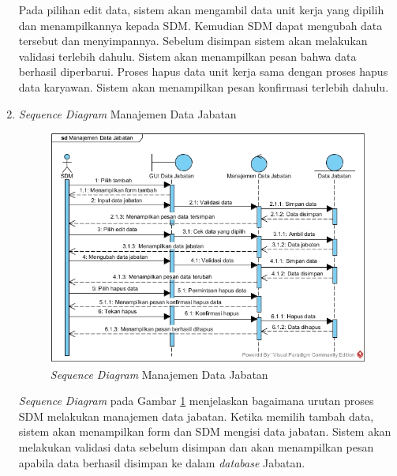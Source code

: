 \begin{enumerate}
            		Pada pilihan edit data, sistem akan mengambil data unit kerja yang dipilih dan menampilkannya kepada SDM. Kemudian SDM dapat mengubah data tersebut dan menyimpannya. Sebelum disimpan sistem akan melakukan validasi terlebih dahulu. Sistem akan menampilkan pesan bahwa data berhasil diperbarui. Proses hapus data unit kerja sama dengan proses hapus data karyawan. Sistem akan menampilkan pesan konfirmasi terlebih dahulu.
            	\item \emph{Sequence Diagram} Manajemen Data Jabatan
			        \begin{figure}[H]
            		    \centering
            		    \includegraphics[width=13cm]{gambar/sequence/manajemen-jabatan}
            		    \caption{\emph{Sequence Diagram} Manajemen Data Jabatan}
            		    \label{sequence_manajemen_jabatan}
            		\end{figure}
            		\emph{Sequence Diagram} pada Gambar \ref{sequence_manajemen_jabatan} menjelaskan bagaimana urutan proses SDM melakukan manajemen data jabatan. Ketika memilih tambah data, sistem akan menampilkan form dan SDM mengisi data jabatan. Sistem akan melakukan validasi data sebelum disimpan dan akan menampilkan pesan apabila data berhasil disimpan ke dalam \emph{database} Jabatan.
            		

\end{enumerate}
